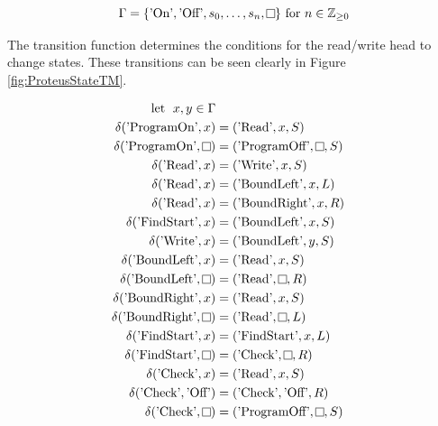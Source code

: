 \[
\Gamma = \{\text{'On'}, \text{'Off'}, s_{0}, \dots, s_{n}, \raisebox{0.1cm}{\fbox{}}\} \text{ for } n \in \mathbb{Z}_{\geq \text{0}}
\]

The transition function determines the conditions for the read/write head to change states.
These transitions can be seen clearly in Figure \ref{fig:ProteusStateTM}.


\[
    \begin{aligned}
        \text{let \hspace{0.1cm}} x, y \in \Gamma\\
        \delta (\text{'ProgramOn'}, x) &= (\text{'Read'}, x, S)\\
        \delta (\text{'ProgramOn'}, \raisebox{0.1cm}{\fbox{}}) &= (\text{'ProgramOff'}, \raisebox{0.1cm}{\fbox{}}, S)\\
%
        \delta (\text{'Read'}, x) &= (\text{'Write'}, x, S)\\
        \delta (\text{'Read'}, x) &= (\text{'BoundLeft'}, x, L)\\
        \delta (\text{'Read'}, x) &= (\text{'BoundRight'}, x, R)\\
        \delta (\text{'FindStart'}, x) &= (\text{'BoundLeft'}, x, S)\\
%
        \delta (\text{'Write'}, x) &= (\text{'BoundLeft'}, y, S)\\
%
        \delta (\text{'BoundLeft'}, x) &= (\text{'Read'}, x, S)\\
        \delta (\text{'BoundLeft'}, \raisebox{0.1cm}{\fbox{}}) &= (\text{'Read'}, \raisebox{0.1cm}{\fbox{}}, R)\\
%
        \delta (\text{'BoundRight'}, x) &= (\text{'Read'}, x, S)\\
        \delta (\text{'BoundRight'}, \raisebox{0.1cm}{\fbox{}}) &= (\text{'Read'}, \raisebox{0.1cm}{\fbox{}}, L)\\
%
        \delta (\text{'FindStart'}, x) &= (\text{'FindStart'}, x, L)\\
        \delta (\text{'FindStart'}, \raisebox{0.1cm}{\fbox{}}) &= (\text{'Check'}, \raisebox{0.1cm}{\fbox{}}, R)\\
%
        \delta (\text{'Check'}, x) &= (\text{'Read'}, x, S)\\
        \delta (\text{'Check'}, \text{'Off'}) &= (\text{'Check'}, \text{'Off'}, R)\\
        \delta (\text{'Check'}, \raisebox{0.1cm}{\fbox{}}) &= (\text{'ProgramOff'}, \raisebox{0.1cm}{\fbox{}}, S)\\
    \end{aligned}
\]

